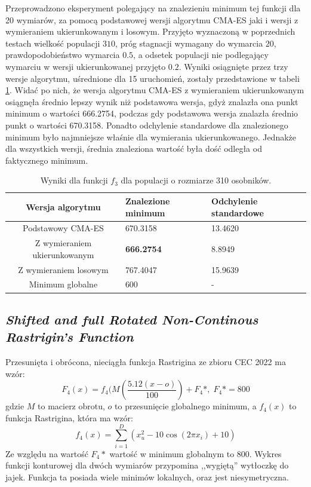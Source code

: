 \documentclass[10pt]{article}
\begin{document}
Przeprowadzono eksperyment polegający na znalezieniu minimum tej funkcji dla 20 wymiarów, za pomocą podstawowej wersji algorytmu CMA-ES jaki i wersji z wymieraniem ukierunkowanym i losowym. Przyjęto wyznaczoną w poprzednich testach wielkość populacji $310$, próg stagnacji wymagany do wymarcia $20$, prawdopodobieństwo wymarcia $0.5$, a odsetek populacji nie podlegający wymarciu w wersji ukierunkowanej przyjęto $0.2$. Wyniki osiągnięte przez trzy wersje algorytmu, uśrednione dla 15 uruchomień,  zostały przedstawione w tabeli \ref{tab:test-Schaffer}. Widać po nich, że wersja algorytmu CMA-ES z wymieraniem ukierunkowanym osiągnęła średnio lepszy wynik niż podstawowa wersja, gdyż znalazła ona punkt minimum o wartości 666.2754, podczas gdy podstawowa wersja znalazła średnio punkt o wartości 670.3158. Ponadto
odchylenie standardowe dla znalezionego minimum było najmniejsze właśnie dla wymierania ukierunkowanego. Jednakże dla wszystkich wersji, średnia znaleziona wartość była dość odległa od faktycznego minimum.
\begin{table}[H]
\centering
\begin{tabularx}{0.9\textwidth}{c|X|X}
Wersja algorytmu & Znalezione minimum & Odchylenie standardowe\\
\hline
Podstawowy CMA-ES & 670.3158 & 13.4620 \\
\hline
Z wymieraniem ukierunkowanym & \textbf{666.2754} & 8.8949 \\
\hline
Z wymieraniem losowym & 767.4047 & 15.9639\\
\hline 
\hline
Minimum globalne & 600 & -
\end{tabularx}
\caption{Wyniki dla funkcji $f_3$ dla populacji o rozmiarze 310 osobników.}
\label{tab:test-Schaffer}
\end{table}

\subsection{\textit{Shifted and full Rotated Non-Continous Rastrigin's Function}}
Przesunięta i obrócona, nieciągła funkcja Rastrigina ze zbioru CEC 2022 ma wzór:
$$F_4(x) = f_4(M(\frac{5.12(x-o)}{100}) + F_4*, \; F_4* = 800$$
gdzie $M$ to macierz obrotu, $o$ to przesunięcie globalnego minimum, a $f_4(x)$ to funkcja Rastrigina, która ma wzór:
$$f_4(x) = \sum_{i=1}^D(x_u^2 - 10\cos(2\pi x_i) + 10)$$
Ze względu na wartość $F_4*$ wartość w minimum globalnym to 800. Wykres funkcji konturowej dla dwóch wymiarów przypomina ,,wygiętą'' wytłoczkę do jajek. Funkcja ta posiada wiele minimów lokalnych, oraz jest niesymetryczna.\\
\end{document}
